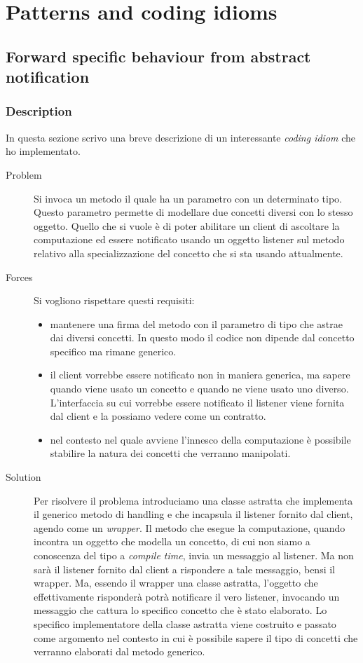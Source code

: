 \section{Patterns and coding idioms}

\subsection{Forward specific behaviour from abstract notification}

\subsubsection*{Description}
In questa sezione scrivo una breve descrizione di un interessante
\emph{coding idiom} che ho implementato.
\begin{description}
\item[Problem] Si invoca un metodo il quale ha un parametro con un
  determinato tipo. Questo parametro permette di modellare due
  concetti diversi con lo stesso oggetto. Quello che si vuole \`e di
  poter abilitare un client di ascoltare la computazione ed essere
  notificato usando un oggetto listener sul metodo relativo alla
  specializzazione del concetto che si sta usando attualmente.
\item[Forces] Si vogliono rispettare questi requisiti:
  \begin{itemize}
  \item mantenere una firma del metodo con il parametro di tipo che
    astrae dai diversi concetti. In questo modo il codice non dipende
    dal concetto specifico ma rimane generico.
  \item il client vorrebbe essere notificato non in maniera generica,
    ma sapere quando viene usato un concetto e quando ne viene usato
    uno diverso. L'interfaccia su cui vorrebbe essere notificato il
    listener viene fornita dal client e la possiamo vedere come un
    contratto. 
  \item nel contesto nel quale avviene l'innesco della computazione
    \`e possibile stabilire la natura dei concetti che verranno
    manipolati.
  \end{itemize}
\item[Solution] Per risolvere il problema introduciamo una classe
  astratta che implementa il generico metodo di handling e che
  incapsula il listener fornito dal client, agendo come un
  \emph{wrapper}. Il metodo che esegue la computazione, quando
  incontra un oggetto che modella un concetto, di cui non siamo a
  conoscenza del tipo a \emph{compile time}, invia un messaggio al
  listener. Ma non sar\`a il listener fornito dal client a rispondere
  a tale messaggio, bensi il wrapper. Ma, essendo il wrapper una
  classe astratta, l'oggetto che effettivamente risponder\`a potr\`a
  notificare il vero listener, invocando un messaggio che cattura lo
  specifico concetto che \`e stato elaborato. Lo specifico
  implementatore della classe astratta viene costruito e passato come
  argomento nel contesto in cui \`e possibile sapere il tipo di
  concetti che verranno elaborati dal metodo generico.
\end{description}

